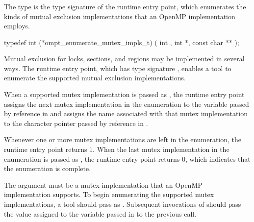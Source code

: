 \subsubsection{}
\label{sec:ompt_enumerate_mutex_impls_t}
\label{sec:ompt_enumerate_mutex_impls}
\label{sec:ompt_mutex_impl_none}

\summary
The  type is the type signature of 
the  runtime entry point, which
enumerates the kinds of mutual exclusion implementations that an OpenMP 
implementation employs.

\format
\begin{ccppspecific}
\begin{omptInquiry}
typedef int (*ompt_enumerate_mutex_impls_t) (
  int ,
  int *,
  const char **
);
\end{omptInquiry}
\end{ccppspecific}

\descr
Mutual exclusion for locks,  sections, and  
regions may be implemented in several ways. The  
runtime entry point, which has type signature ,
enables a tool to enumerate the supported mutual exclusion implementations.

When a supported mutex implementation is passed as , the 
runtime entry point assigns the next mutex implementation in the enumeration 
to the variable passed by reference in  and assigns the name 
associated with that mutex implementation to the character pointer passed by 
reference in .

Whenever one or more mutex implementations are left in the enumeration, the 
 runtime entry point returns $1$. When the 
last mutex implementation in the enumeration is passed as , the 
runtime entry point returns $0$, which indicates that the enumeration is complete.

\argdesc
The  argument must be a mutex implementation that an OpenMP 
implementation supports. To begin enumerating the supported mutex implementations, 
a tool should pass  as . 
Subsequent invocations of  should pass the
value assigned to the variable passed in  to the previous call.

